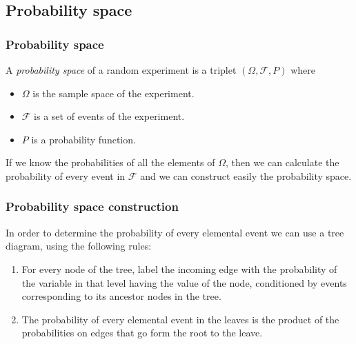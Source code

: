 \subsection{Probability space}

\begin{frame}
\frametitle{Probability space}
\begin{definition}
A \emph{probability space} of a random experiment is a triplet $(\Omega,\mathcal{F},P)$ where
\begin{itemize}
\item $\Omega$ is the sample space of the experiment.
\item $\mathcal{F}$ is a set of events of the experiment.
\item $P$ is a probability function. 
\end{itemize} 
\end{definition}

If we know the probabilities of all the elements of $\Omega$, then we can calculate the probability of every event in
$\mathcal{F}$ and we can construct easily the probability space. 
\end{frame}


\begin{frame}
\frametitle{Probability space construction}
In order to determine the probability of every elemental event we can use a tree diagram, using the following rules:
\begin{enumerate}
\item For every node of the tree, label the incoming edge with the probability of the variable in that level having the
value of the node, conditioned by events corresponding to its ancestor nodes in the tree.
\item The probability of every elemental event in the leaves is the product of the probabilities on edges
that go form the root to the leave.
\end{enumerate}
\begin{center}
\end{center}
\end{frame}


